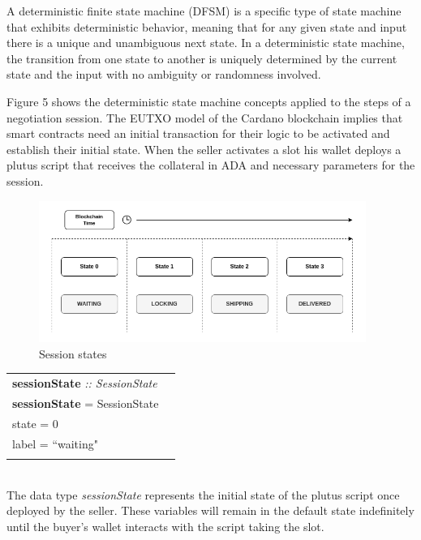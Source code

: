 \documentclass[12pt]{article}
\begin{document}
A deterministic finite state machine (DFSM) is a specific type of state machine that exhibits deterministic behavior, meaning that for any given state and input there is a unique and unambiguous next state. In a deterministic state machine, the transition from one state to another is uniquely determined by the current state and the input with no ambiguity or randomness involved.

Figure 5 shows the deterministic state machine concepts applied to the steps of a negotiation session. 
The EUTXO model of the Cardano blockchain implies that smart contracts need an initial transaction for their logic to be activated and establish their initial state.
When the seller activates a slot his wallet deploys a plutus script that receives the collateral in ADA and necessary parameters for the session. 

\begin{figure}[ht]
  \centering
  \includegraphics[width=0.95\textwidth]{machine.png}
  \caption{Session states}
  \label{fig:States}
\end{figure}


\begin{tabular}{lr}
\textbf{sessionState} \emph{:: SessionState}\\
\textbf{sessionState}  = SessionState  \textbraceleft{}
\\ \hspace{54mm}state = 0
\\ \hspace{54mm}label = ``waiting"
\\\hspace{51mm}\textbraceright{} 
\end{tabular}
\\

 The data type \emph{sessionState} represents the initial state of the plutus script once deployed by the seller. These variables will remain in the default state indefinitely until the buyer's wallet interacts with the script taking the slot.
\\
\end{document}

